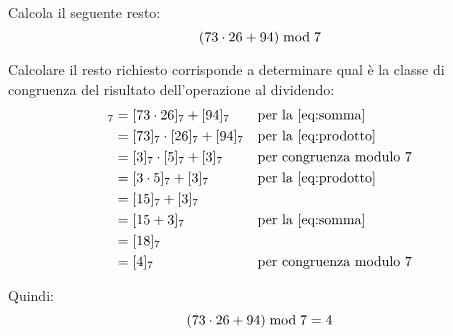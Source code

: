 \begin{esercizio}
    Calcola il seguente resto:
    \begin{equation*}
        (73 \cdot 26 + 94)  \bmod  7
    \end{equation*}

    Calcolare il resto richiesto corrisponde a determinare qual è la classe di congruenza del risultato dell'operazione al dividendo:
    \begin{align*}
        [73 \cdot 26 + 94]_7 &= [73 \cdot 26]_7 + [94]_7 &&\text{per la~\eqref{eq:somma}} \\
        &= [73]_7 \cdot [26]_7 + [94]_7 &&\text{per la~\eqref{eq:prodotto}} \\
        &= [3]_7 \cdot [5]_7 + [3]_7 &&\text{per congruenza modulo 7} \\
        &= [3 \cdot 5]_7 + [3]_7 &&\text{per la~\eqref{eq:prodotto}} \\
        &= [15]_7 + [3]_7 \\
        &= [15 + 3]_7 &&\text{per la~\eqref{eq:somma}} \\
        &= [18]_7 \\
        &= [4]_7 &&\text{per congruenza modulo 7}
    \end{align*}

    Quindi:
    \begin{equation*}
        (73 \cdot 26 + 94)  \bmod  7 = 4
    \end{equation*}
\end{esercizio}

